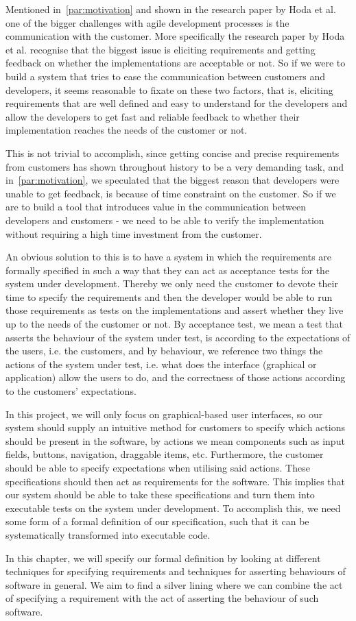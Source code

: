 Mentioned in~\autoref{par:motivation} and shown in the research paper by Hoda et al.~\cite{Hoda2011TheIO} one of the bigger challenges with agile development processes is the communication with the customer.
More specifically the research paper by Hoda et al. recognise that the biggest issue is eliciting requirements and getting feedback on whether the implementations are acceptable or not.
So if we were to build a system that tries to ease the communication between customers and developers, it seems reasonable to fixate on these two factors, that is, eliciting requirements that are well defined and easy to understand for the developers and allow the developers to get fast and reliable feedback to whether their implementation reaches the needs of the customer or not.

This is not trivial to accomplish, since getting concise and precise requirements from customers has shown throughout history to be a very demanding task, and in~\autoref{par:motivation}, we speculated that the biggest reason that developers were unable to get feedback, is because of time constraint on the customer.
So if we are to build a tool that introduces value in the communication between developers and customers - we need to be able to verify the implementation without requiring a high time investment from the customer.

An obvious solution to this is to have a system in which the requirements are formally specified in such a way that they can act as acceptance tests for the system under development.
Thereby we only need the customer to devote their time to specify the requirements and then the developer would be able to run those requirements as tests on the implementations and assert whether they live up to the needs of the customer or not.
By acceptance test, we mean a test that asserts the behaviour of the system under test, is according to the expectations of the users, i.e. the customers, and by behaviour, we reference two things the actions of the system under test, i.e. what does the interface (graphical or application) allow the users to do, and the correctness of those actions according to the customers' expectations.

In this project, we will only focus on graphical-based user interfaces, so our system should supply an intuitive method for customers to specify which actions should be present in the software, by actions we mean components such as input fields, buttons, navigation, draggable items, etc.
Furthermore, the customer should be able to specify expectations when utilising said actions.
These specifications should then act as requirements for the software.
This implies that our system should be able to take these specifications and turn them into executable tests on the system under development.
To accomplish this, we need some form of a formal definition of our specification, such that it can be systematically transformed into executable code.

In this chapter, we will specify our formal definition by looking at different techniques for specifying requirements and techniques for asserting behaviours of software in general.
We aim to find a silver lining where we can combine the act of specifying a requirement with the act of asserting the behaviour of such software. 

